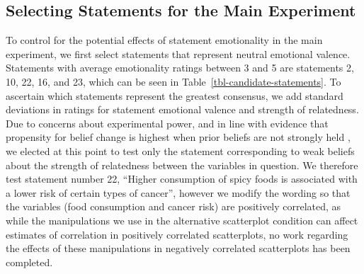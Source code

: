 \documentclass[manuscript,screen,review,anonymous]{acmart}
\begin{document}
\subsection{Selecting Statements for the Main
Experiment}\label{sec-selecting-statements}

To control for the potential effects of statement emotionality in the
main experiment, we first select statements that represent neutral
emotional valence. Statements with average emotionality ratings between
3 and 5 are statements 2, 10, 22, 16, and 23, which can be seen in
Table~\ref{tbl-candidate-statements}. To ascertain which statements
represent the greatest consensus, we add standard deviations in ratings
for statement emotional valence and strength of relatedness. Due to
concerns about experimental power, and in line with evidence that
propensity for belief change is highest when prior beliefs are not
strongly held \citep{xiong_2022, markant_2023}, we elected at this point
to test only the statement corresponding to weak beliefs about the
strength of relatedness between the variables in question. We therefore
test statement number 22, ``Higher consumption of spicy foods is
associated with a lower risk of certain types of cancer'', however we
modify the wording so that the variables (food consumption and cancer
risk) are positively correlated, as while the manipulations we use in
the alternative scatterplot condition can affect estimates of
correlation in positively correlated scatterplots, no work regarding the
effects of these manipulations in negatively correlated scatterplots has
been completed.

\begin{table}

\caption{\label{tbl-candidate-statements}Statements with neutral average
emotional valence ratings.}


\end{table}%
\end{document}
